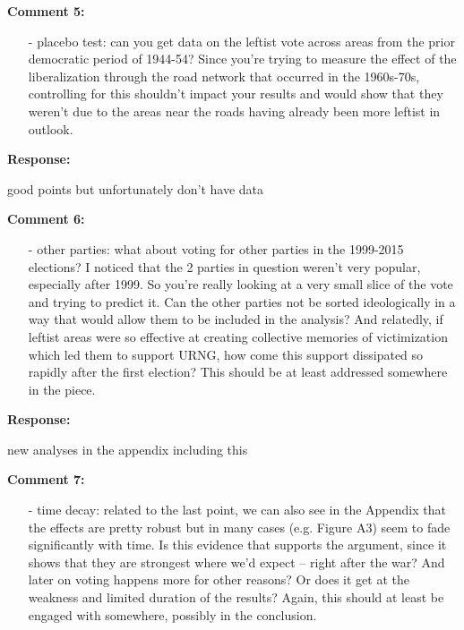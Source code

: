 \documentclass[12pt, a4paper, notitlepage]{article}
\begin{document}
\vspace{15pt}
\noindent\textbf{Comment 5:}
\begin{displayquote}
\begin{itemize}
\item[-] placebo test: can you get data on the leftist vote across areas from the prior democratic period of 1944-54? Since you’re trying to measure the effect of the liberalization through the road network that occurred in the 1960s-70s, controlling for this shouldn’t impact your results and would show that they weren’t due to the areas near the roads having already been more leftist in outlook.
\end{itemize}
\end{displayquote}

\noindent\textbf{Response:} {}

good points but unfortunately don't have data

\vspace{15pt}
\noindent\textbf{Comment 6:}
\begin{displayquote}
\begin{itemize}
\item[-] other parties: what about voting for other parties in the 1999-2015 elections? I noticed that the 2 parties in question weren’t very popular, especially after 1999. So you’re really looking at a very small slice of the vote and trying to predict it. Can the other parties not be sorted ideologically in a way that would allow them to be included in the analysis? And relatedly, if leftist areas were so effective at creating collective memories of victimization which led them to support URNG, how come this support dissipated so rapidly after the first election? This should be at least addressed somewhere in the piece.
\end{itemize}
\end{displayquote}

\noindent\textbf{Response:} {}

new analyses in the appendix including this

\vspace{15pt}
\noindent\textbf{Comment 7:}
\begin{displayquote}
\begin{itemize}
\item[-] time decay: related to the last point, we can also see in the Appendix that the effects are pretty robust but in many cases (e.g. Figure A3) seem to fade significantly with time. Is this evidence that supports the argument, since it shows that they are strongest where we’d expect – right after the war? And later on voting happens more for other reasons? Or does it get at the weakness and limited duration of the results? Again, this should at least be engaged with somewhere, possibly in the conclusion.
\end{itemize}
\end{displayquote}
\end{document}
